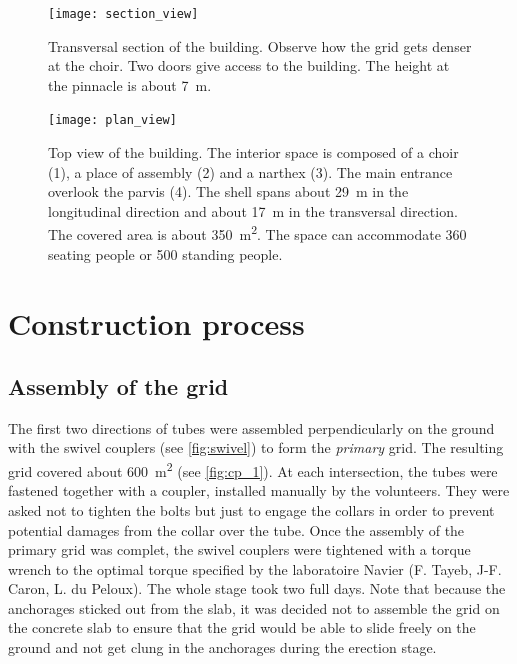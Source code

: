 \begin{figure}[p]
	\captionsetup[subfloat]{captionskip=20pt}
     	\centering
	\begin{fullpage}	
		\texttt{[image: section\_view]}
		\caption[Transversal section of the building]{Transversal section of the building. Observe how the grid gets denser at the choir. Two doors give access to the building. The height at the pinnacle is about 7~m.}
		\label{fig:sec}
		\vspace{1.5cm}
		\texttt{[image: plan\_view]}
		\caption[Top view of the building]{Top view of the building. The interior space is composed of a choir (1), a place of assembly (2) and a narthex (3). The main entrance overlook the parvis (4). The shell spans about 29~m in the longitudinal direction and about 17~m in the transversal direction. The covered area is about 350~m\textsuperscript{2}. The space can accommodate 360 seating people or 500 standing people.}
		\label{fig:plan_view}	
	\end{fullpage}
\end{figure}

\clearpage


\section{Construction process}\label{sec=construction_process}

\subsection{Assembly of the grid}
The first two directions of tubes were assembled perpendicularly on the ground with the swivel couplers (see \cref{fig:swivel}) to form the \emph{primary} grid. The resulting grid covered about 600~m\textsuperscript{2} (see \cref{fig:cp_1}). At each intersection, the tubes were fastened together with a coupler, installed manually by the volunteers. They were asked not to tighten the bolts but just to engage the collars in order to prevent potential damages from the collar over the tube. Once the assembly of the primary grid was complet, the swivel couplers were tightened with a torque wrench to the optimal torque specified by the laboratoire Navier (F. Tayeb, J-F. Caron, L. du Peloux). The whole stage took two full days. Note that because the anchorages sticked out from the slab, it was decided not to assemble the grid on the concrete slab to ensure that the grid would be able to slide freely on the ground and not get clung in the anchorages during the erection stage.

